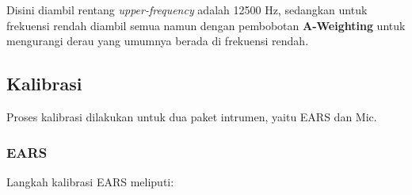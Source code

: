 \documentclass[12pt,]{article}
\begin{document}
	Disini diambil rentang \textit{upper-frequency} adalah 12500 Hz,
	sedangkan untuk frekuensi rendah diambil semua namun dengan pembobotan \textbf{A-Weighting}
	untuk mengurangi derau yang umumnya berada di frekuensi rendah.
	
	\subsection{Kalibrasi}
	
	Proses kalibrasi dilakukan untuk dua paket intrumen, yaitu EARS dan Mic.
	
	\subsubsection{EARS}
	
	Langkah kalibrasi EARS meliputi:
\end{document}
